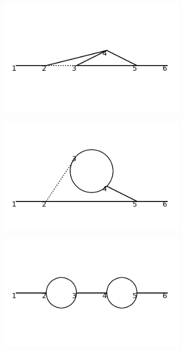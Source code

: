 \documentclass[11pt,a4paper,twoside,pdf]{article}
\numberwithin{equation}{section}
\begin{document}
\begin{figure}[h!]
    \begin{subfigure}[t]{0.19\textwidth}
        \centering
        \includegraphics[width=\textwidth]{plots/order4_1to1/3.png}
        \caption{ }
    \end{subfigure}
    \begin{subfigure}[t]{0.19\textwidth}
        \centering
        \includegraphics[width=\textwidth]{plots/order4_1to1/4.png}
        \caption{ }
    \end{subfigure}
    \begin{subfigure}[t]{0.19\textwidth}
        \centering
        \includegraphics[width=\textwidth]{plots/order4_1to1/5.png}

\end{subfigure}
\end{figure}
\end{document}
